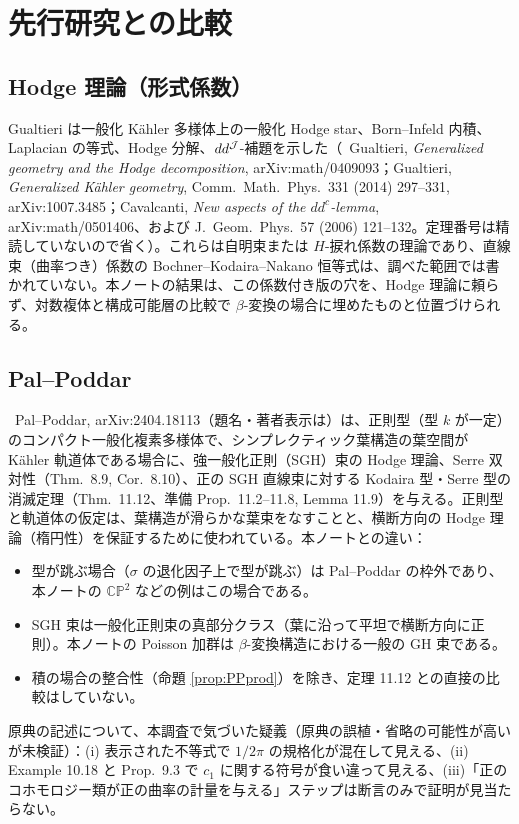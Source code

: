\section{先行研究との比較}\label{sec:compare}
\subsection{Hodge 理論（形式係数）}
Gualtieri は一般化 Kähler 多様体上の一般化 Hodge star、Born--Infeld 内積、Laplacian の等式、Hodge 分解、$dd^{\mathcal J}$-補題を示した（\tC\ Gualtieri, \emph{Generalized geometry and the Hodge decomposition}, arXiv:math/0409093；Gualtieri, \emph{Generalized K\"ahler geometry}, Comm.\ Math.\ Phys.\ 331 (2014) 297--331, arXiv:1007.3485；Cavalcanti, \emph{New aspects of the $dd^c$-lemma}, arXiv:math/0501406、および J.\ Geom.\ Phys.\ 57 (2006) 121--132。定理番号は精読していないので省く\tQ）。これらは自明束または $H$-捩れ係数の理論であり、直線束（曲率つき）係数の Bochner--Kodaira--Nakano 恒等式は、調べた範囲では書かれていない。本ノートの結果は、この係数付き版の穴を、Hodge 理論に頼らず、対数複体と構成可能層の比較で $\beta$-変換の場合に埋めたものと位置づけられる。

\subsection{Pal--Poddar}
\tC\ Pal--Poddar, arXiv:2404.18113（題名・著者表示は\tQ）は、正則型（型 $k$ が一定）のコンパクト一般化複素多様体で、シンプレクティック葉構造の葉空間が Kähler 軌道体である場合に、強一般化正則（SGH）束の Hodge 理論、Serre 双対性（Thm.\ 8.9, Cor.\ 8.10）、正の SGH 直線束に対する Kodaira 型・Serre 型の消滅定理（Thm.\ 11.12、準備 Prop.\ 11.2--11.8, Lemma 11.9）を与える。正則型と軌道体の仮定は、葉構造が滑らかな葉束をなすことと、横断方向の Hodge 理論（楕円性）を保証するために使われている。本ノートとの違い：
\begin{itemize}
\item 型が跳ぶ場合（$\sigma$ の退化因子上で型が跳ぶ）は Pal--Poddar の枠外であり、本ノートの $\mathbb{CP}^2$ などの例はこの場合である。
\item SGH 束は一般化正則束の真部分クラス（葉に沿って平坦で横断方向に正則）。本ノートの Poisson 加群は $\beta$-変換構造における一般の GH 束である。
\item 積の場合の整合性（命題 \ref{prop:PPprod}）を除き、定理 11.12 との直接の比較はしていない\tQ。
\end{itemize}
原典の記述について、本調査で気づいた疑義（原典の誤植・省略の可能性が高いが未検証\tQ）：(i) 表示された不等式で $1/2\pi$ の規格化が混在して見える、(ii) Example 10.18 と Prop.\ 9.3 で $c_1$ に関する符号が食い違って見える、(iii)「正のコホモロジー類が正の曲率の計量を与える」ステップは断言のみで証明が見当たらない。


